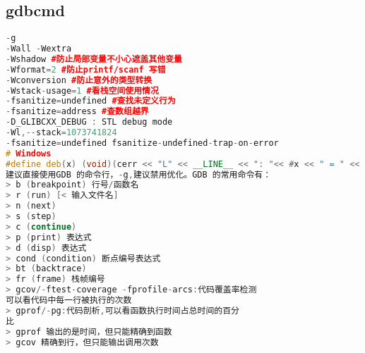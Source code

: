 \subsection{gdbcmd}
\begin{lstlisting}[language=C++]
-g
-Wall -Wextra
-Wshadow #防止局部变量不小心遮盖其他变量
-Wformat=2 #防止printf/scanf 写错
-Wconversion #防止意外的类型转换
-Wstack-usage=1 #看栈空间使用情况
-fsanitize=undefined #查找未定义行为
-fsanitize=address #查数组越界
-D_GLIBCXX_DEBUG : STL debug mode
-Wl,--stack=1073741824
-fsanitize=undefined fsanitize-undefined-trap-on-error
# Windows
#define deb(x) (void)(cerr << "L" << __LINE__ << ": "<< #x << " = " << (x) << endl)
建议直接使用GDB 的命令行，-g,建议禁用优化。GDB 的常用命令有：
> b (breakpoint) 行号/函数名
> r (run) [< 输入文件名]
> n (next)
> s (step)
> c (continue)
> p (print) 表达式
> d (disp) 表达式
> cond (condition) 断点编号表达式
> bt (backtrace)
> fr (frame) 栈帧编号
> gcov/-ftest-coverage -fprofile-arcs:代码覆盖率检测
可以看代码中每一行被执行的次数
> gprof/-pg:代码剖析,可以看函数执行时间占总时间的百分
比
> gprof 输出的是时间，但只能精确到函数
> gcov 精确到行，但只能输出调用次数
\end{lstlisting}
